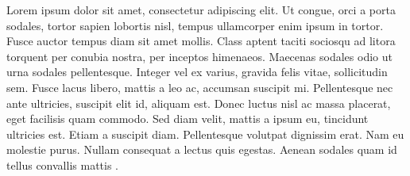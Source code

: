 \documentclass[12pt,a4paper]{article}
\title{}
\author{Benjamin M. A'Lee}
\date{}
\begin{document}
\maketitle

Lorem ipsum dolor sit amet, consectetur adipiscing elit. Ut congue, orci a porta
sodales, tortor sapien lobortis nisl, tempus ullamcorper enim ipsum in
tortor. Fusce auctor tempus diam sit amet mollis. Class aptent taciti sociosqu
ad litora torquent per conubia nostra, per inceptos himenaeos. Maecenas sodales
odio ut urna sodales pellentesque. Integer vel ex varius, gravida felis vitae,
sollicitudin sem. Fusce lacus libero, mattis a leo ac, accumsan suscipit
mi. Pellentesque nec ante ultricies, suscipit elit id, aliquam est. Donec luctus
nisl ac massa placerat, eget facilisis quam commodo. Sed diam velit, mattis a
ipsum eu, tincidunt ultricies est. Etiam a suscipit diam. Pellentesque volutpat
dignissim erat. Nam eu molestie purus. Nullam consequat a lectus quis
egestas. Aenean sodales quam id tellus convallis mattis \parencite{cicero45}.

\makebib
\end{document}
